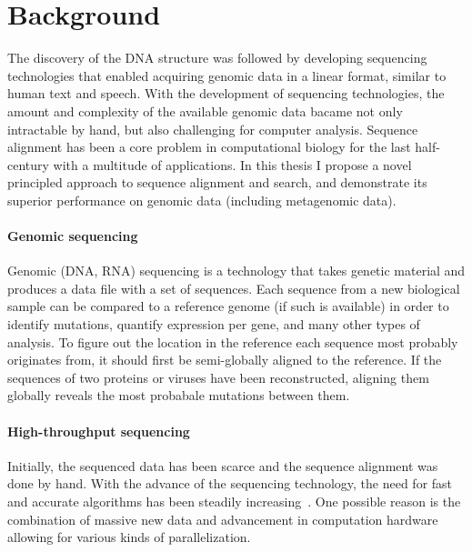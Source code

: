 \section*{Background}

The discovery of the DNA structure\citep{watson1953structure} was followed by
developing sequencing technologies that enabled acquiring genomic data in a
linear format, similar to human text and speech. With the development of
sequencing technologies, the amount and complexity of the available genomic data
bacame not only intractable by hand, but also challenging for computer analysis.
Sequence alignment has been a core problem in computational biology for the last
half-century with a multitude of applications. In this thesis I propose a novel
principled approach to sequence alignment and search, and demonstrate its
superior performance on genomic data (including metagenomic data).

\paragraph{Genomic sequencing}
Genomic (DNA, RNA) sequencing is a technology that takes genetic material and
produces a data file with a set of sequences. Each sequence from a new
biological sample can be compared to a reference genome (if such is available)
in order to identify mutations, quantify expression per gene, and many other
types of analysis. To figure out the location in the reference each sequence
most probably originates from, it should first be semi-globally aligned to the
reference. If the sequences of two proteins or viruses have been reconstructed,
aligning them globally reveals the most probabale mutations between them.

\paragraph{High-throughput sequencing}
Initially, the sequenced data has been scarce and the sequence alignment was
done by hand. With the advance of the sequencing technology, the need for fast
and accurate algorithms has been steadily increasing~\cite{alser2021technology}.
One possible reason is the combination of massive new data and advancement in
computation hardware allowing for various kinds of parallelization.

